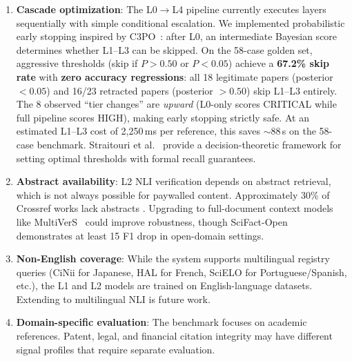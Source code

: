 \documentclass[sigconf,nonacm]{acmart}
\begin{document}
\begin{enumerate}
    The current naive Bayes with kill-shot override (89.7\% accuracy, 0\% FPR, 100\% hallucination recall) remains optimal.
    Copula-based score fusion~\cite{chen2025copula,xu2025copula} or conflict-aware Dempster-Shafer variants~\cite{su2025ds,jiang2023ds} are promising directions for principled correlation handling without sacrificing calibration.

    \item \textbf{Cascade optimization}: The L0$\rightarrow$L4 pipeline currently executes layers sequentially with simple conditional escalation.
    We implemented probabilistic early stopping inspired by C3PO~\cite{ding2025c3po}: after L0, an intermediate Bayesian score determines whether L1--L3 can be skipped.
    On the 58-case golden set, aggressive thresholds (skip if $P > 0.50$ or $P < 0.05$) achieve a \textbf{67.2\% skip rate} with \textbf{zero accuracy regressions}: all 18 legitimate papers (posterior $< 0.05$) and 16/23 retracted papers (posterior $> 0.50$) skip L1--L3 entirely.
    The 8 observed ``tier changes'' are \emph{upward} (L0-only scores CRITICAL while full pipeline scores HIGH), making early stopping strictly safe.
    At an estimated L1--L3 cost of 2,250\,ms per reference, this saves $\sim$88\,s on the 58-case benchmark.
    Straitouri et al.~\cite{straitouri2025} provide a decision-theoretic framework for setting optimal thresholds with formal recall guarantees.

    \item \textbf{Abstract availability}: L2 NLI verification depends on abstract retrieval, which is not always possible for paywalled content. Approximately 30\% of Crossref works lack abstracts \cite{crossref2024}.
    Upgrading to full-document context models like MultiVerS~\cite{multivers2022} could improve robustness, though SciFact-Open~\cite{wadden2022open} demonstrates at least 15 F1 drop in open-domain settings.

    \item \textbf{Non-English coverage}: While the system supports multilingual registry queries (CiNii for Japanese, HAL for French, SciELO for Portuguese/Spanish, etc.), the L1 and L2 models are trained on English-language datasets. Extending to multilingual NLI is future work.

    \item \textbf{Domain-specific evaluation}: The benchmark focuses on academic references. Patent, legal, and financial citation integrity may have different signal profiles that require separate evaluation.
\end{enumerate}
\end{document}
